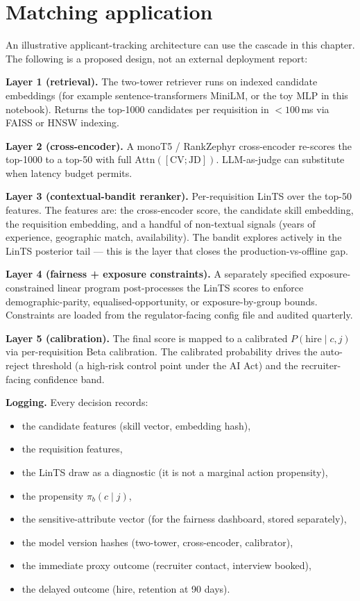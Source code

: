 \documentclass[11pt,oneside]{scrbook}
\begin{document}
\chapter{Matching application}

\begin{matching}
An illustrative applicant-tracking architecture can use the cascade in this
chapter. The following is a proposed design, not an external deployment report:

\textbf{Layer 1 (retrieval).} The two-tower retriever runs on indexed
candidate embeddings (for example sentence-transformers MiniLM, or the
toy MLP in this notebook). Returns the top-1000 candidates per requisition
in $<100$\,ms via FAISS or HNSW indexing.

\textbf{Layer 2 (cross-encoder).} A monoT5 / RankZephyr cross-encoder
re-scores the top-1000 to a top-50 with full $\mathrm{Attn}([\mathrm{CV}; \mathrm{JD}])$.
LLM-as-judge can substitute when latency budget permits.

\textbf{Layer 3 (contextual-bandit reranker).} Per-requisition LinTS over
the top-50 features. The features are: the cross-encoder score, the
candidate skill embedding, the requisition embedding, and a handful of
non-textual signals (years of experience, geographic match, availability).
The bandit explores actively in the LinTS posterior tail --- this is the
layer that closes the production-vs-offline gap.

\textbf{Layer 4 (fairness + exposure constraints).} A separately specified exposure-constrained
linear program post-processes the LinTS scores to enforce
demographic-parity, equalised-opportunity, or exposure-by-group bounds.
Constraints are loaded from the regulator-facing config file and audited
quarterly.

\textbf{Layer 5 (calibration).} The final score is mapped to a calibrated
$P(\text{hire} \mid c, j)$ via per-requisition Beta calibration. The
calibrated probability drives the auto-reject threshold (a high-risk
control point under the AI Act) and the recruiter-facing confidence band.

\textbf{Logging.} Every decision records:
\begin{itemize}\setlength\itemsep{0pt}
  \item the candidate features (skill vector, embedding hash),
  \item the requisition features,
  \item the LinTS draw as a diagnostic (it is not a marginal action propensity),
  \item the propensity $\pi_b(c \mid j)$,
  \item the sensitive-attribute vector (for the fairness dashboard, stored separately),
  \item the model version hashes (two-tower, cross-encoder, calibrator),
  \item the immediate proxy outcome (recruiter contact, interview booked),
  \item the delayed outcome (hire, retention at 90 days).
\end{itemize}


\end{matching}
\end{document}

